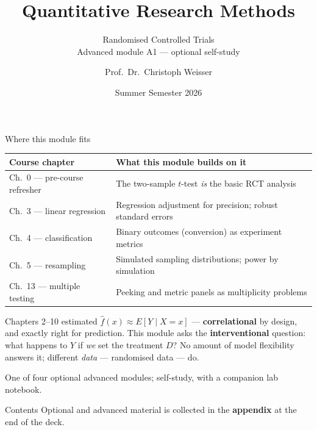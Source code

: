 \documentclass[aspectratio=169,11pt]{beamer}
\title{Quantitative Research Methods}
\subtitle{Randomised Controlled Trials\\[2pt]{\small Advanced module A1 --- optional self-study}}
\author{Prof.\ Dr.\ Christoph Weisser}\institute{HSBI}
\date{Summer Semester 2026}\graphicspath{{images/}}
\begin{document}
\begin{frame}[plain]\titlepage\end{frame}

\begin{frame}{Where this module fits}
  \footnotesize
  \begin{center}
  \begin{tabular}{@{}p{3.6cm}p{8.6cm}@{}}
    \toprule
    \textbf{Course chapter} & \textbf{What this module builds on it} \\
    \midrule
    Ch.\ 0 --- pre-course refresher & The two-sample $t$-test \emph{is} the basic RCT analysis \\
    Ch.\ 3 --- linear regression & Regression adjustment for precision; robust standard errors \\
    Ch.\ 4 --- classification & Binary outcomes (conversion) as experiment metrics \\
    Ch.\ 5 --- resampling & Simulated sampling distributions; power by simulation \\
    Ch.\ 13 --- multiple testing & Peeking and metric panels as multiplicity problems \\
    \bottomrule
  \end{tabular}
  \end{center}
  \vspace{2pt}
  \begin{takeaway}
    Chapters 2--10 estimated $\hat f(x)\approx E[Y\mid X=x]$ --- \textbf{correlational} by
    design, and exactly right for prediction. This module asks the \textbf{interventional}
    question: what happens to $Y$ if \emph{we} set the treatment $D$? No amount of model
    flexibility answers it; different \emph{data} --- randomised data --- do.
  \end{takeaway}
  {\scriptsize One of four optional advanced modules; self-study, with a companion lab notebook.}
\end{frame}

\begin{frame}{Contents}\small\tableofcontents[hideallsubsections]
  \vfill
  {\tiny Optional and advanced material is collected in the \textbf{appendix} at the end of the deck.}
\end{frame}
\end{document}
